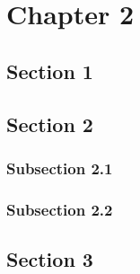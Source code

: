 
\chapter{Chapter 2} %
\label{Chapter2} %

\section{Section 1}

\lipsum[1-3]

\section{Section 2}

\lipsum[8]

\subsection{Subsection 2.1}

\lipsum[4-5]

\subsection{Subsection 2.2}

\lipsum[6-7]

\section{Section 3}

\lipsum[10-11]


\cleardoublepage